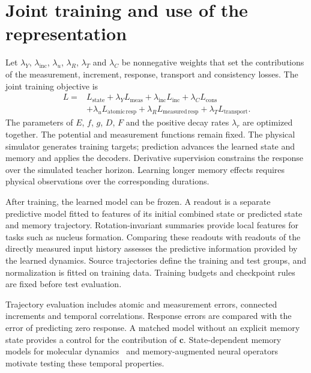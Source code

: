 \documentclass[11pt,a4paper]{article}
\newcommand{\cstate}{\mathbf c}
\begin{document}
\newpage
\section{Joint training and use of the representation}

Let $\lambda_Y$, $\lambda_{\mathrm{inc}}$, $\lambda_u$, $\lambda_R$,
$\lambda_T$ and $\lambda_C$ be nonnegative weights that set the contributions
of the measurement, increment, response, transport and consistency losses.
The joint training objective is
\[
\boxed{\begin{aligned}
L={}&L_{\mathrm{state}}
+\lambda_Y L_{\mathrm{meas}}
+\lambda_{\mathrm{inc}}L_{\mathrm{inc}}
+\lambda_C L_{\mathrm{cons}}\\
&+\lambda_u L_{\mathrm{atomic\,resp}}
+\lambda_R L_{\mathrm{measured\,resp}}
+\lambda_T L_{\mathrm{transport}}.
\end{aligned}}
\]
The parameters of $E$, $f$, $g$, $D$, $F$ and the positive decay rates
$\lambda_r$ are optimized together. The potential and measurement functions
remain fixed. The physical simulator generates training targets; prediction
advances the learned state and memory and applies the decoders. Derivative
supervision constrains the response over the simulated teacher horizon.
Learning longer memory effects requires physical observations over the
corresponding durations.

After training, the learned model can be frozen. A readout is a separate
predictive model fitted to features of its initial combined state or predicted
state and memory trajectory. Rotation-invariant summaries provide local features for
tasks such as nucleus formation. Comparing these readouts with readouts of
the directly measured input history assesses the predictive information
provided by the learned dynamics. Source trajectories define the training
and test groups, and normalization is fitted on training data. Training
budgets and checkpoint rules are fixed before test evaluation.

Trajectory evaluation includes atomic and measurement errors, connected
increments and temporal correlations. Response errors are compared with the
error of predicting zero response. A matched model without an explicit memory
state provides a control for the contribution of $\cstate$. State-dependent
memory models for molecular dynamics~\cite{ge2024} and memory-augmented neural
operators~\cite{buitrago2025} motivate testing these temporal properties.
\end{document}
